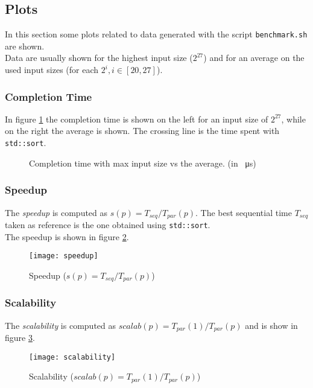 \documentclass[]{article}
\def\code#1{\texttt{#1}}
\begin{document}
\subsection{Plots}
\label{sec:plots}
In this section some plots related to data generated with the script \code{benchmark.sh} are shown.\\
Data are usually shown for the highest input size ($2^{27}$) and for an average on the used input sizes (for each $ 2^i, i \in [20,27]$).

\subsubsection{Completion Time}
In figure \ref{fig:execution} the completion time is shown on the left for an input size of $2^{27}$, while on the right the average is shown. The crossing line is the time spent with \code{std::sort}. 
\begin{figure}[H]
	\qquad
	\caption{Completion time with max input size vs the average. (in \SI{}{\micro \second})}
	\label{fig:execution}
\end{figure}

\subsubsection{Speedup}
The \emph{speedup} is computed as $s(p) = T_{seq}/T_{par}(p)$. The best sequential time $T_{seq}$ taken as reference is the one obtained using \code{std::sort}.\\
The speedup is shown in figure \ref{fig:speedup}.
\begin{figure}[H]
	\centering
	\texttt{[image: speedup]}
	\caption{Speedup ($s(p) = T_{seq}/T_{par}(p)$)}
	\label{fig:speedup}
\end{figure}

\subsubsection{Scalability}
The \emph{scalability} is computed as $\mathit{scalab}(p) = T_{par}(1)/T_{par}(p)$ and is show in figure \ref{fig:scalab}.
\begin{figure}[H]
	\centering
	\texttt{[image: scalability]}
	\caption{Scalability ($\mathit{scalab}(p) = T_{par}(1)/T_{par}(p)$)}
	\label{fig:scalab}
\end{figure}
\end{document}
